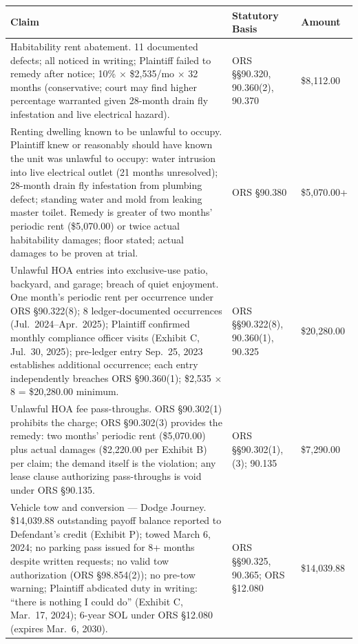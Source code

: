 \documentclass[12pt,letterpaper]{article}
\begin{document}
\begin{singlespace}
\noindent\begin{longtable}{|p{2.8in}|p{1.4in}|p{1.0in}|}
\hline
\textbf{Claim} & \textbf{Statutory Basis} & \textbf{Amount} \\
\hline
Habitability rent abatement. 11 documented defects; all noticed in writing; Plaintiff failed to remedy after notice; 10\% $\times$ \$2,535/mo $\times$ 32 months (conservative; court may find higher percentage warranted given 28-month drain fly infestation and live electrical hazard). & ORS \S\S90.320, 90.360(2), 90.370 & \$8,112.00 \\
\hline
Renting dwelling known to be unlawful to occupy. Plaintiff knew or reasonably should have known the unit was unlawful to occupy: water intrusion into live electrical outlet (21 months unresolved); 28-month drain fly infestation from plumbing defect; standing water and mold from leaking master toilet. Remedy is greater of two months' periodic rent (\$5,070.00) or twice actual habitability damages; floor stated; actual damages to be proven at trial. & ORS \S90.380 & \$5,070.00+ \\
\hline
Unlawful HOA entries into exclusive-use patio, backyard, and garage; breach of quiet enjoyment. One month's periodic rent per occurrence under ORS \S90.322(8); 8 ledger-documented occurrences (Jul.\ 2024--Apr.\ 2025); Plaintiff confirmed monthly compliance officer visits (Exhibit C, Jul.\ 30, 2025); pre-ledger entry Sep.\ 25, 2023 establishes additional occurrence; each entry independently breaches ORS \S90.360(1); \$2,535 $\times$ 8 = \$20,280.00 minimum. & ORS \S\S90.322(8), 90.360(1), 90.325 & \$20,280.00 \\
\hline
Unlawful HOA fee pass-throughs. ORS \S90.302(1) prohibits the charge; ORS \S90.302(3) provides the remedy: two months' periodic rent (\$5,070.00) plus actual damages (\$2,220.00 per Exhibit B) per claim; the demand itself is the violation; any lease clause authorizing pass-throughs is void under ORS \S90.135. & ORS \S\S90.302(1), (3); 90.135 & \$7,290.00 \\
\hline
Vehicle tow and conversion --- Dodge Journey. \$14,039.88 outstanding payoff balance reported to Defendant's credit (Exhibit P); towed March 6, 2024; no parking pass issued for 8+ months despite written requests; no valid tow authorization (ORS \S98.854(2)); no pre-tow warning; Plaintiff abdicated duty in writing: ``there is nothing I could do'' (Exhibit C, Mar.\ 17, 2024); 6-year SOL under ORS \S12.080 (expires Mar.\ 6, 2030). & ORS \S\S90.325, 90.365; ORS \S12.080 & \$14,039.88 \\

\end{longtable}
\end{singlespace}
\end{document}
